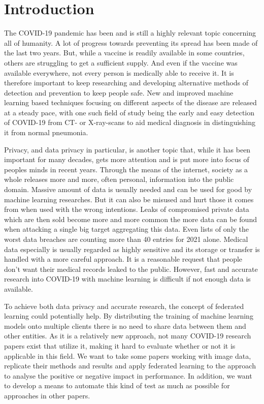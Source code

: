 \section{Introduction}

The COVID-19 pandemic has been and is still a highly relevant topic concerning all of humanity. A lot of progress towards preventing its spread has been made of the last two years. But, while a vaccine is readily available in some countries, others are struggling to get a sufficient supply. And even if the vaccine was available everywhere, not every person is medically able to receive it. It is therefore important to keep researching and developing alternative methods of detection and prevention to keep people safe. New and improved machine learning based techniques focusing on different aspects of the disease are released at a steady pace, with one such field of study being the early and easy detection of COVID-19 from CT- or X-ray-scans to aid medical diagnosis in distinguishing it from normal pneumonia.

Privacy, and data privacy in particular, is another topic that, while it has been important for many decades, gets more attention and is put more into focus of peoples minds in recent years. Through the means of the internet, society as a whole releases more and more, often personal, information into the public domain. Massive amount of data is usually needed and can be used for good by machine learning researches. But it can also be misused and hurt those it comes from when used with the wrong intentions. Leaks of compromised private data which are then sold become more and more common the more data can be found when attacking a single big target aggregating this data. Even lists of only the worst data breaches are counting more than 40 entries for 2021 alone.\cite{data_breaches}
Medical data especially is usually regarded as highly sensitive and its storage or transfer is handled with a more careful approach. It is a reasonable request that people don't want their medical records leaked to the public. However, fast and accurate research into COVID-19 with machine learning is difficult if not enough data is available. 

To achieve both data privacy and accurate research, the concept of federated learning could potentially help. By distributing the training of machine learning models onto multiple clients there is no need to share data between them and other entities. As it is a relatively new approach, not many COVID-19 research papers exist that utilize it, making it hard to evaluate whether or not it is applicable in this field. We want to take some papers working with image data, replicate their methods and results and apply federated learning to the approach to analyse the positive or negative impact in performance. In addition, we want to develop a means to automate this kind of test as much as possible for approaches in other papers. 


